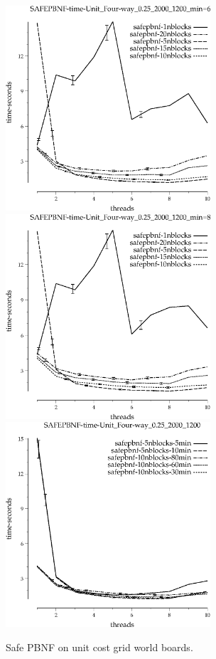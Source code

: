 \documentclass{article}
\begin{document}
\begin{appendices}
\begin{figure}[h!]
\includegraphics[width=3in]{../graphs/grid_unit_four-way_0.25_2000_1200/SAFEPBNF-time-Unit_Four-way_0.25_2000_1200_min=60.eps}
\includegraphics[width=3in]{../graphs/grid_unit_four-way_0.25_2000_1200/SAFEPBNF-time-Unit_Four-way_0.25_2000_1200_min=80.eps}
\includegraphics[width=3in]{../graphs/grid_unit_four-way_0.25_2000_1200/SAFEPBNF-time-Unit_Four-way_0.25_2000_1200.eps}
\caption{Safe PBNF on unit cost grid world boards.}
\label{fig:SafePBNF-grid}
\end{figure}


\end{appendices}
\end{document}
